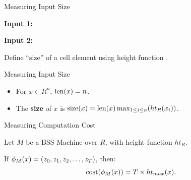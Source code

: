 \documentclass[c]{beamer}
\begin{document}
\begin{frame}{Measuring Input Size}

  \begin{center}
    \textbf{Input 1:}
  \end{center}

  \begin{center}
    \textbf{Input 2:}
  \end{center}\pause

  Define ``size'' of a cell element using height function
  .
  
\end{frame}

\begin{frame}{Measuring Input Size}
  
  \begin{itemize}
  \item[] For $x \in R^n$, $\text{len}(x) = n$.

    \vspace{\baselineskip}
    
  \item[] The \textbf{size} of $x$ is $\text{size}(x) = \text{len}(x)\max_{1 \leq i \leq n}(ht_R(x_i))$.
  \end{itemize}
  
\end{frame}

\begin{frame}{Measuring Computation Cost}
  
  Let $M$ be a BSS Machine over $R$, with height function $ht_R$.

  \vspace{\baselineskip}

  If $\phi_M(x) = (z_0, z_1, z_2, \ldots, z_T)$, then:
  $$\text{cost}(\phi_M(x)) = T\times ht_{max}(x).$$
  
\end{frame}
\end{document}
